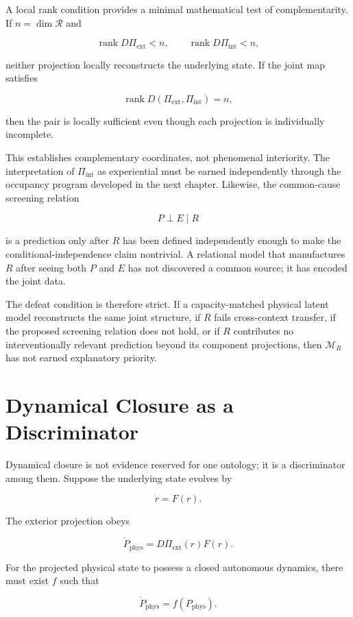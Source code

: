 A local rank condition provides a minimal mathematical test of complementarity. If $n=\dim\mathscr R$ and

\[
\operatorname{rank}D\Pi_{\mathrm{ext}}<n,
\qquad
\operatorname{rank}D\Pi_{\mathrm{int}}<n,
\]

neither projection locally reconstructs the underlying state. If the joint map satisfies

\[
\operatorname{rank}D(\Pi_{\mathrm{ext}},\Pi_{\mathrm{int}})=n,
\]

then the pair is locally sufficient even though each projection is individually incomplete.

This establishes complementary coordinates, not phenomenal interiority. The interpretation of $\Pi_{\mathrm{int}}$ as experiential must be earned independently through the occupancy program developed in the next chapter. Likewise, the common-cause screening relation

\[
P\perp E\mid R
\]

is a prediction only after $R$ has been defined independently enough to make the conditional-independence claim nontrivial. A relational model that manufactures $R$ after seeing both $P$ and $E$ has not discovered a common source; it has encoded the joint data.

The defeat condition is therefore strict. If a capacity-matched physical latent model reconstructs the same joint structure, if $R$ fails cross-context transfer, if the proposed screening relation does not hold, or if $R$ contributes no interventionally relevant prediction beyond its component projections, then $\mathcal M_R$ has not earned explanatory priority.

\section{Dynamical Closure as a Discriminator}

Dynamical closure is not evidence reserved for one ontology; it is a discriminator among them. Suppose the underlying state evolves by

\[
\dot r=F(r).
\]

The exterior projection obeys

\[
\dot P_{\mathrm{phys}}=D\Pi_{\mathrm{ext}}(r)F(r).
\]

For the projected physical state to possess a closed autonomous dynamics, there must exist $f$ such that

\[
\dot P_{\mathrm{phys}}=f(P_{\mathrm{phys}}).
\]


